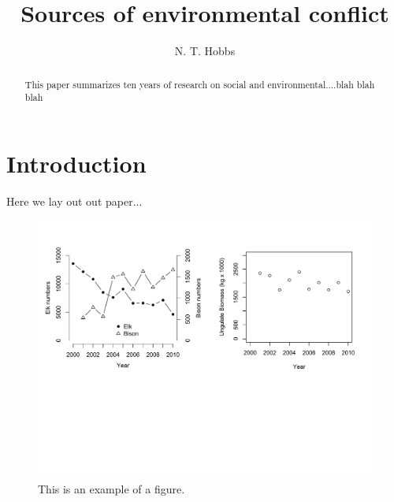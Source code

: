 \documentclass[11pt,american]{article}
\begin{document}
\title{Sources of environmental conflict}


\author{N. T. Hobbs}
\maketitle
\begin{abstract}
This paper summarizes ten years of research on social and environmental....blah
blah blah
\end{abstract}

\section{Introduction}

Here we lay out out paper...

\begin{figure}
\center\includegraphics[width=5in]{47_Users_Tom_Documents_lyx_Materials_for_lyx_wo___LyX-templates1_NSF_Proposal_biomass_numbers.pdf}\caption{This is an example of a figure.}


\end{figure}
\end{document}

